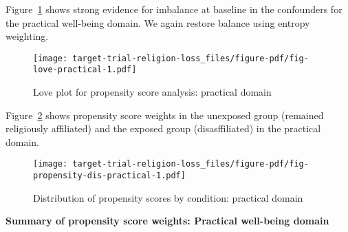 \documentclass[
  singlecolumn]{report}
\begin{document}
Figure~\ref{fig-love-practical} shows strong evidence for imbalance at
baseline in the confounders for the practical well-being domain. We
again restore balance using entropy weighting.

\begin{figure}

{\centering \texttt{[image: target-trial-religion-loss\_files/figure-pdf/fig-love-practical-1.pdf]}

}

\caption{\label{fig-love-practical}Love plot for propensity score
analysis: practical domain}

\end{figure}

Figure~\ref{fig-propensity-dis-practical} shows propensity score weights
in the unexposed group (remained religiously affiliated) and the exposed
group (disasffiliated) in the practical domain.

\begin{figure}

{\centering \texttt{[image: target-trial-religion-loss\_files/figure-pdf/fig-propensity-dis-practical-1.pdf]}

}

\caption{\label{fig-propensity-dis-practical}Distribution of propensity
scores by condition: practical domain}

\end{figure}

\textbf{Summary of propensity score weights: Practical well-being
domain}
\end{document}
